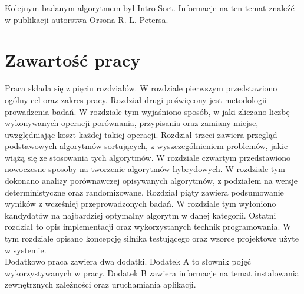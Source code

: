 Kolejnym badanym algorytmem był Intro Sort. Informacje na ten temat znaleźć w publikacji  autorstwa Orsona R. L. Petersa.\\

\section{Zawartość pracy}
Praca składa się z pięciu rozdziałów.
W rozdziale pierwszym przedstawiono ogólny cel oraz zakres pracy.
Rozdział drugi poświęcony jest metodologii prowadzenia badań. W rozdziale tym wyjaśniono sposób, w jaki zliczano liczbę wykonywanych operacji porównania, przypisania oraz zamiany miejsc, uwzględniając koszt każdej takiej operacji.
Rozdział trzeci zawiera przegląd podstawowych algorytmów sortujących, z wyszczególnieniem problemów, jakie wiążą się ze stosowania tych algorytmów.
W rozdziale czwartym przedstawiono nowoczesne sposoby na tworzenie algorytmów hybrydowych. W rozdziale tym dokonano analizy porównawczej opisywanych algorytmów, z podziałem na wersje deterministyczne oraz randomizowane.
Rozdział piąty zawiera podsumowanie wyników z wcześniej przeprowadzonych badań. W rozdziale tym wyłoniono kandydatów na najbardziej optymalny algorytm w danej kategorii.
Ostatni rozdział to opis implementacji oraz wykorzystanych technik programowania. W tym rozdziale opisano koncepcję silnika testującego oraz wzorce projektowe użyte w systemie.\\

Dodatkowo praca zawiera dwa dodatki.
Dodatek A to słownik pojęć wykorzystywanych w pracy.
Dodatek B zawiera informacje na temat instalowania zewnętrznych zależności oraz uruchamiania aplikacji.\\
